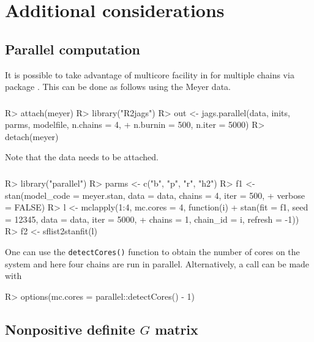 \documentclass[article]{jss}
\begin{document}
\section{Additional considerations}\label{additions}

\subsection{Parallel computation}\label{pc}
It is possible to take advantage of multicore facility in  for 
multiple chains via package  \citep{R}. 
This can be done as follows using the Meyer data.

\subsubsection[JAGS]{}
%
\begin{Schunk}
\begin{Sinput}
R> attach(meyer)
R> library("R2jags")
R> out <- jags.parallel(data, inits, parms, modelfile, n.chains = 4, 
+    n.burnin = 500, n.iter = 5000)
R> detach(meyer)
\end{Sinput}
\end{Schunk}
%
Note that the data needs to be attached.

\subsubsection[Stan]{}
%
\begin{Schunk}
\begin{Sinput}
R> library("parallel")
R> parms <- c("b", "p", "r", "h2")
R> f1 <- stan(model_code = meyer.stan, data = data, chains = 4, iter = 500,
+    verbose = FALSE)
R> l <- mclapply(1:4, mc.cores = 4, function(i)
+    stan(fit = f1, seed = 12345, data = data, iter = 5000,
+      chains = 1, chain_id = i, refresh = -1))
R> f2 <- sflist2stanfit(l)
\end{Sinput}
\end{Schunk}
%
One can use the \verb/detectCores()/ function to obtain the number of cores
on the system and here four chains are run in parallel. Alternatively, a
call can be made with
%
\begin{Schunk}
\begin{Sinput}
R> options(mc.cores = parallel::detectCores() - 1)
\end{Sinput}
\end{Schunk}
%
\subsection[Nonpositive definite G matrix]{Nonpositive definite $G$ matrix}\label{npd}
\end{document}
